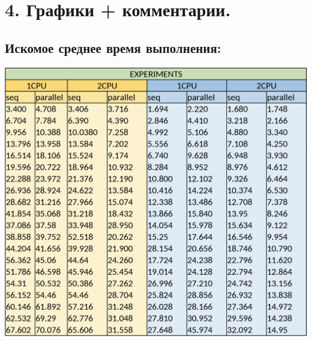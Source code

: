 \documentclass[10pt, a4paper]{article}
\begin{document}
\section*{4. Графики + комментарии.}

\subsection*{Искомое среднее время выполнения:}
\includegraphics[scale=0.6]{table.png}
\end{document}
